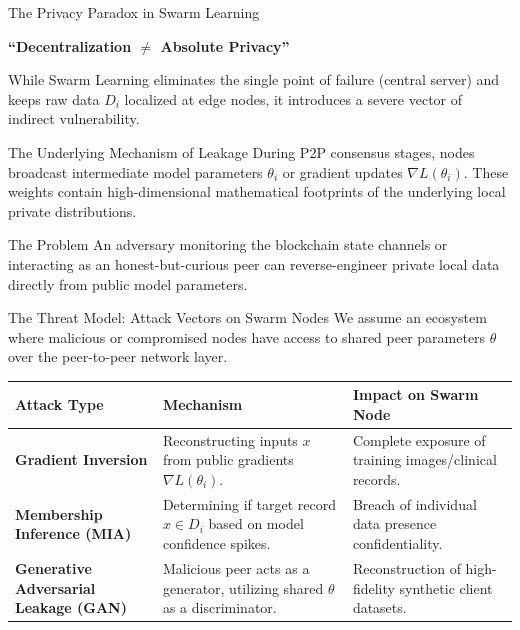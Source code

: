 \documentclass[aspectratio=169]{beamer}
\begin{document}
\begin{frame}{The Privacy Paradox in Swarm Learning}
    \begin{center}
        \large{\textbf{``Decentralization $\neq$ Absolute Privacy''}}
    \end{center}
    \vspace{0.3cm}

    While Swarm Learning eliminates the single point of failure (central server) and keeps raw data $D_i$ localized at edge nodes, it introduces a severe vector of indirect vulnerability.

    \begin{block}{The Underlying Mechanism of Leakage}
        During P2P consensus stages, nodes broadcast intermediate model parameters $\theta_i$ or gradient updates $\nabla L(\theta_i)$. These weights contain high-dimensional mathematical footprints of the underlying local private distributions.
    \end{block}

    \begin{alertblock}{The Problem}
        An adversary monitoring the blockchain state channels or interacting as an honest-but-curious peer can reverse-engineer private local data directly from public model parameters.
    \end{alertblock}
\end{frame}

\begin{frame}{The Threat Model: Attack Vectors on Swarm Nodes}
    We assume an ecosystem where malicious or compromised nodes have access to shared peer parameters $\theta$ over the peer-to-peer network layer.

    \vspace{0.3cm}
    \begin{table}[]
        \centering
        \small
        \begin{tabular}{p{3.5cm} p{4.5cm} p{4.5cm}}
            \toprule
            \textbf{Attack Type} & \textbf{Mechanism} & \textbf{Impact on Swarm Node} \\
            \midrule
            \textbf{Gradient Inversion} & Reconstructing inputs $x$ from public gradients $\nabla L(\theta_i)$. & Complete exposure of training images/clinical records. \\
            \addlinespace
            \textbf{Membership Inference (MIA)} & Determining if target record $x \in D_i$ based on model confidence spikes. & Breach of individual data presence confidentiality. \\
            \addlinespace
            \textbf{Generative Adversarial Leakage (GAN)} & Malicious peer acts as a generator, utilizing shared $\theta$ as a discriminator. & Reconstruction of high-fidelity synthetic client datasets. \\
            \bottomrule
        \end{tabular}
    \end{table}
\end{frame}
\end{document}
